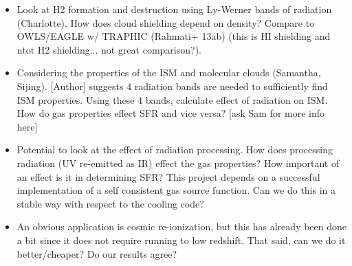 \begin{itemize}
\item Look at H2 formation and destruction using Ly-Werner bands of radiation (Charlotte). How does cloud shielding depend on density? Compare to OWLS/EAGLE w/ TRAPHIC (Rahmati+ 13ab) (this is HI shielding and ntot H2 shielding... not great comparison?).
\item Considering the properties of the ISM and molecular clouds (Samantha, Sijing). [Author] suggests 4 radiation bands are needed to sufficiently find ISM properties. Using these 4 bands, calculate effect of radiation on ISM. How do gas properties effect SFR and vice versa? [ask Sam for more info here]
\item Potential to look at the effect of radiation processing. How does processing radiation (UV re-emitted as IR) effect the gas properties? How important of an effect is it in determining SFR? This project depends on a successful implementation of a self consistent gas source function. Can we do this in a stable way with respect to the cooling code?
\item An obvious application is cosmic re-ionization, but this has already been done a bit since it does not require running to low redshift. That said, can we do it better/cheaper? Do our results agree? 
\end{itemize}

%
% 
%
% 
%
%
